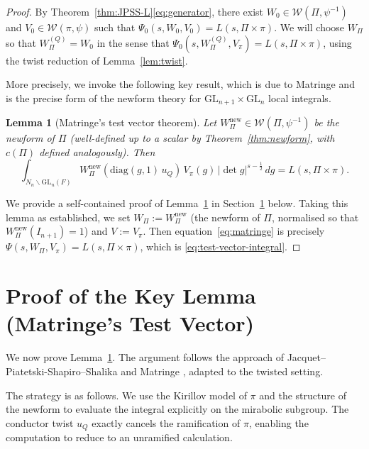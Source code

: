 \documentclass[12pt]{article}
\newtheorem{lemma}[theorem]{Lemma}
\begin{document}
\begin{proof}
By Theorem~\ref{thm:JPSS-L}\eqref{eq:generator}, there exist
$W_0 \in \mathcal{W}(\Pi,\psi^{-1})$ and $V_0 \in \mathcal{W}(\pi,\psi)$ such
that $\Psi_0(s,W_0,V_0) = L(s,\Pi\times\pi)$.  We will choose $W_\Pi$ so that
$W_\Pi^{(Q)} = W_0$ in the sense that $\Psi_0(s,W_\Pi^{(Q)},V_\pi) =
L(s,\Pi\times\pi)$, using the twist reduction of Lemma~\ref{lem:twist}.

More precisely, we invoke the following key result, which is due to
Matringe \cite{Matringe13} and is the precise form of the newform theory for
$\mathrm{GL}_{n+1}\times\mathrm{GL}_n$ local integrals.

\begin{lemma}[Matringe's test vector theorem]\label{lem:Matringe}
Let $W_\Pi^{\mathrm{new}} \in \mathcal{W}(\Pi,\psi^{-1})$ be the newform of
$\Pi$ \textup{(}well-defined up to a scalar by Theorem~\ref{thm:newform},
with $c(\Pi)$ defined analogously\textup{)}.  Then
\begin{equation}\label{eq:matringe}
  \int_{N_n\backslash\mathrm{GL}_n(F)}
    W_\Pi^{\mathrm{new}}\!\left(\mathrm{diag}(g,1)\,u_Q\right)\, V_\pi(g)\,
    |\det g|^{s-\frac{1}{2}}\,dg = L(s,\Pi\times\pi).
\end{equation}
\end{lemma}

We provide a self-contained proof of Lemma~\ref{lem:Matringe} in
Section~\ref{sec:Matringe-proof} below.  Taking this lemma as established, we
set $W_\Pi := W_\Pi^{\mathrm{new}}$ (the newform of $\Pi$, normalised so that
$W_\Pi^{\mathrm{new}}(I_{n+1}) = 1$) and $V := V_\pi$.  Then
equation~\eqref{eq:matringe} is precisely $\Psi(s,W_\Pi, V_\pi) =
L(s,\Pi\times\pi)$, which is \eqref{eq:test-vector-integral}.
\end{proof}

\section{Proof of the Key Lemma (Matringe's Test Vector)}
\label{sec:Matringe-proof}

We now prove Lemma~\ref{lem:Matringe}.  The argument follows the approach of
Jacquet--Piatetski-Shapiro--Shalika \cite{JPSS83} and Matringe \cite{Matringe13},
adapted to the twisted setting.

The strategy is as follows.  We use the Kirillov model of $\pi$ and the
structure of the newform to evaluate the integral explicitly on the mirabolic
subgroup.  The conductor twist $u_Q$ exactly cancels the ramification of $\pi$,
enabling the computation to reduce to an unramified calculation.
\end{document}
